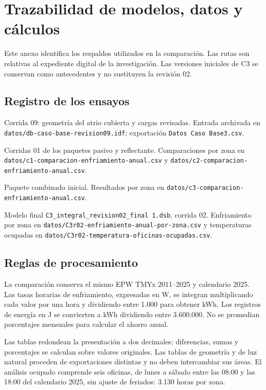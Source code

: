 \chapter{Trazabilidad de modelos, datos y cálculos}
\label{anexo:trazabilidad}
Este anexo identifica los respaldos utilizados en la comparación. Las rutas son relativas al expediente digital de la investigación. Las versiones iniciales de C3 se conservan como antecedentes y no sustituyen la revisión 02.
\section{Registro de los ensayos}
\begin{description}\raggedright
\item[CB.] Corrida 09: geometría del atrio cubierta y cargas revisadas. Entrada archivada en \nolinkurl{datos/db-caso-base-revision09.idf}; exportación \nolinkurl{Datos Caso Base3.csv}.
\item[C1 y C2.] Corridas 01 de los paquetes pasivo y reflectante. Comparaciones por zona en \nolinkurl{datos/c1-comparacion-enfriamiento-anual.csv} y \nolinkurl{datos/c2-comparacion-enfriamiento-anual.csv}.
\item[C3 revisión 01.] Paquete combinado inicial. Resultados por zona en \nolinkurl{datos/c3-comparacion-enfriamiento-anual.csv}.
\item[C3 revisión 02.] Modelo final \nolinkurl{C3_integral_revision02_final 1.dsb}, corrida 02. Enfriamiento por zona en \nolinkurl{datos/C3r02-enfriamiento-anual-por-zona.csv} y temperaturas ocupadas en \nolinkurl{datos/C3r02-temperatura-oficinas-ocupadas.csv}.
\end{description}
\section{Reglas de procesamiento}
La comparación conserva el mismo EPW TMYx 2011--2025 y calendario 2025. Las tasas horarias de enfriamiento, expresadas en W, se integran multiplicando cada valor por una hora y dividiendo entre 1.000 para obtener kWh. Los registros de energía en J se convierten a kWh dividiendo entre 3.600.000. No se promedian porcentajes mensuales para calcular el ahorro anual.

Las tablas redondean la presentación a dos decimales; diferencias, sumas y porcentajes se calculan sobre valores originales. Las tablas de geometría y de luz natural proceden de exportaciones distintas y no deben intercambiar sus áreas. El análisis ocupado comprende seis oficinas, de lunes a sábado entre las 08:00 y las 18:00 del calendario 2025, sin ajuste de feriados: 3.130 horas por zona.

